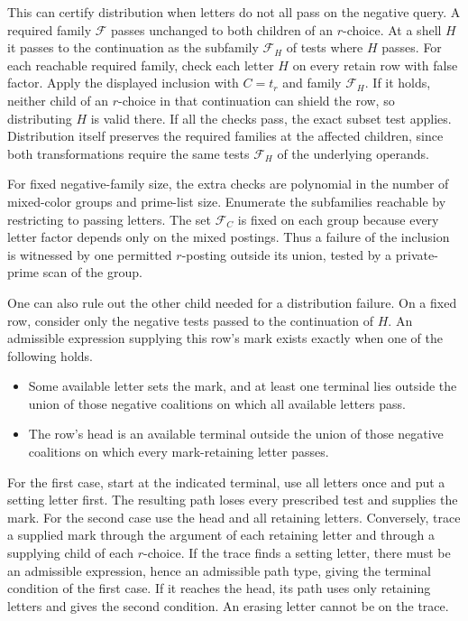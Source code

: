 This can certify distribution when letters do not
all pass on the negative query. A required family
$\mathcal F$ passes unchanged to both children of
an $r$-choice. At a shell $H$ it passes to the
continuation as the subfamily $\mathcal F_H$ of tests
where $H$ passes. For each reachable required family,
check each letter $H$ on every retain row with false
factor. Apply the displayed inclusion with $C=t_r$
and family $\mathcal F_H$. If it holds, neither child
of an $r$-choice in that continuation can shield the
row, so distributing $H$ is valid there. If all the
checks pass, the exact subset test applies. Distribution
itself preserves the required families at the affected
children, since both transformations require the
same tests $\mathcal F_H$ of the underlying operands.

For fixed negative-family size, the extra checks are
polynomial in the number of mixed-color groups and
prime-list size. Enumerate the subfamilies reachable
by restricting to passing letters. The set
$\mathcal F_C$ is fixed on each group because every
letter factor depends only on the mixed postings.
Thus a failure of the inclusion is witnessed by one
permitted $r$-posting outside its union, tested by a
private-prime scan of the group.

One can also rule out the other child needed for a
distribution failure. On a fixed row, consider only
the negative tests passed to the continuation of $H$.
An admissible expression supplying this row's mark
exists exactly when one of the following holds.
\begin{itemize}
\item Some available letter sets the mark, and at
least one terminal lies outside the union of those
negative coalitions on which all available letters pass.
\item The row's head is an available terminal outside
the union of those negative coalitions on which every
mark-retaining letter passes.
\end{itemize}
For the first case, start at the indicated terminal,
use all letters once and put a setting letter first.
The resulting path loses every prescribed test and
supplies the mark. For the second case use the head
and all retaining letters. Conversely, trace a
supplied mark through the argument of each retaining
letter and through a supplying child of each
$r$-choice. If the trace finds a setting letter,
there must be an admissible expression, hence an
admissible path type, giving the terminal condition
of the first case. If it reaches the head, its path
uses only retaining letters and gives the second
condition. An erasing letter cannot be on the trace.


